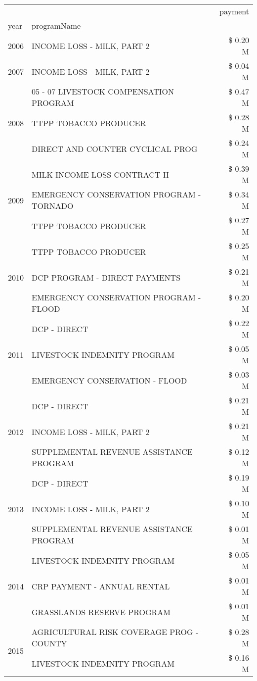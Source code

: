 \begin{tabular}{llr}
\toprule
 &  & payment \\
year & programName &  \\
\midrule
2006 & INCOME LOSS - MILK, PART 2 & \$ 0.20 M \\
\cline{1-3}
2007 & INCOME LOSS - MILK, PART 2 & \$ 0.04 M \\
\cline{1-3}
\multirow[t]{3}{*}{2008} & 05 - 07 LIVESTOCK COMPENSATION PROGRAM & \$ 0.47 M \\
 & TTPP TOBACCO PRODUCER & \$ 0.28 M \\
 & DIRECT AND COUNTER CYCLICAL PROG & \$ 0.24 M \\
\cline{1-3}
\multirow[t]{3}{*}{2009} & MILK INCOME LOSS CONTRACT II & \$ 0.39 M \\
 & EMERGENCY CONSERVATION PROGRAM - TORNADO & \$ 0.34 M \\
 & TTPP TOBACCO PRODUCER & \$ 0.27 M \\
\cline{1-3}
\multirow[t]{3}{*}{2010} & TTPP TOBACCO PRODUCER & \$ 0.25 M \\
 & DCP PROGRAM - DIRECT PAYMENTS & \$ 0.21 M \\
 & EMERGENCY CONSERVATION PROGRAM - FLOOD & \$ 0.20 M \\
\cline{1-3}
\multirow[t]{3}{*}{2011} & DCP - DIRECT & \$ 0.22 M \\
 & LIVESTOCK INDEMNITY PROGRAM & \$ 0.05 M \\
 & EMERGENCY CONSERVATION - FLOOD & \$ 0.03 M \\
\cline{1-3}
\multirow[t]{3}{*}{2012} & DCP - DIRECT & \$ 0.21 M \\
 & INCOME LOSS - MILK, PART 2 & \$ 0.21 M \\
 & SUPPLEMENTAL REVENUE ASSISTANCE PROGRAM & \$ 0.12 M \\
\cline{1-3}
\multirow[t]{3}{*}{2013} & DCP - DIRECT & \$ 0.19 M \\
 & INCOME LOSS - MILK, PART 2 & \$ 0.10 M \\
 & SUPPLEMENTAL REVENUE ASSISTANCE PROGRAM & \$ 0.01 M \\
\cline{1-3}
\multirow[t]{3}{*}{2014} & LIVESTOCK INDEMNITY PROGRAM & \$ 0.05 M \\
 & CRP PAYMENT - ANNUAL RENTAL & \$ 0.01 M \\
 & GRASSLANDS RESERVE PROGRAM & \$ 0.01 M \\
\cline{1-3}
\multirow[t]{3}{*}{2015} & AGRICULTURAL RISK COVERAGE PROG - COUNTY & \$ 0.28 M \\
 & LIVESTOCK INDEMNITY PROGRAM & \$ 0.16 M \\

\end{tabular}
